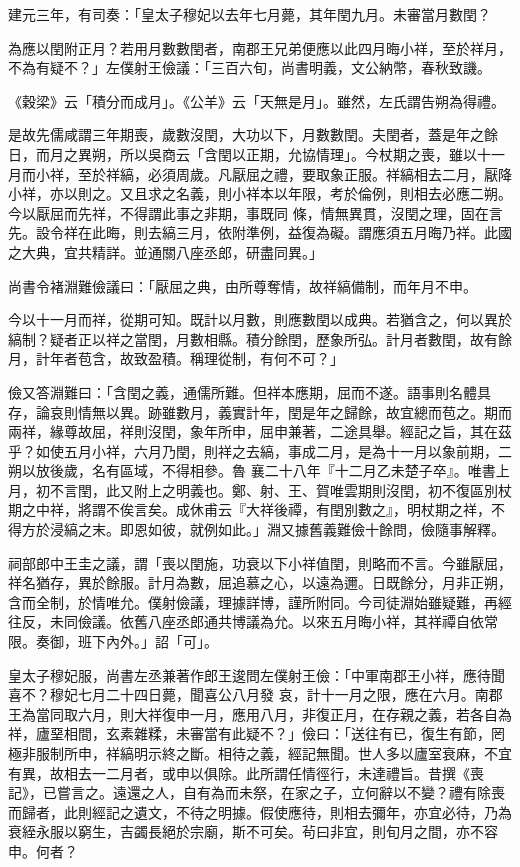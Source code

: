 \begin{pinyinscope}
 建元三年，有司奏：「皇太子穆妃以去年七月薨，其年閏九月。未審當月數閏？



 為應以閏附正月？若用月數數閏者，南郡王兄弟便應以此四月晦小祥，至於祥月，不為有疑不？」左僕射王儉議：「三百六旬，尚書明義，文公納幣，春秋致譏。



 《穀梁》云「積分而成月」。《公羊》云「天無是月」。雖然，左氏謂告朔為得禮。



 是故先儒咸謂三年期喪，歲數沒閏，大功以下，月數數閏。夫閏者，蓋是年之餘日，而月之異朔，所以吳商云「含閏以正期，允協情理」。今杖期之喪，雖以十一月而小祥，至於祥縞，必須周歲。凡厭屈之禮，要取象正服。祥縞相去二月，厭降小祥，亦以則之。又且求之名義，則小祥本以年限，考於倫例，則相去必應二朔。今以厭屈而先祥，不得謂此事之非期，事既同
 條，情無異貫，沒閏之理，固在言先。設令祥在此晦，則去縞三月，依附準例，益復為礙。謂應須五月晦乃祥。此國之大典，宜共精詳。並通關八座丞郎，研盡同異。」



 尚書令褚淵難儉議曰：「厭屈之典，由所尊奪情，故祥縞備制，而年月不申。



 今以十一月而祥，從期可知。既計以月數，則應數閏以成典。若猶含之，何以異於縞制？疑者正以祥之當閏，月數相縣。積分餘閏，歷象所弘。計月者數閏，故有餘月，計年者苞含，故致盈積。稱理從制，有何不可？」



 儉又答淵難曰：「含閏之義，通儒所難。但祥本應期，屈而不遂。語事則名體具存，論哀則情無以異。跡雖數月，義實計年，閏是年之歸餘，故宜總而苞之。期而兩祥，緣尊故屈，祥則沒閏，象年所申，屈申兼著，二途具舉。經記之旨，其在茲乎？如使五月小祥，六月乃閏，則祥之去縞，事成二月，是為十一月以象前期，二朔以放後歲，名有區域，不得相參。魯
 襄二十八年『十二月乙未楚子卒』。唯書上月，初不言閏，此又附上之明義也。鄭、射、王、賀唯雲期則沒閏，初不復區別杖期之中祥，將謂不俟言矣。成休甫云『大祥後禫，有閏別數之』，明杖期之祥，不得方於浸縞之末。即恩如彼，就例如此。」淵又據舊義難儉十餘問，儉隨事解釋。



 祠部郎中王圭之議，謂「喪以閏施，功衰以下小祥值閏，則略而不言。今雖厭屈，祥名猶存，異於餘服。計月為數，屈追慕之心，以遠為邇。日既餘分，月非正朔，含而全制，於情唯允。僕射儉議，理據詳博，謹所附同。今司徒淵始雖疑難，再經往反，未同儉議。依舊八座丞郎通共博議為允。以來五月晦小祥，其祥禫自依常限。奏御，班下內外。」詔「可」。



 皇太子穆妃服，尚書左丞兼著作郎王逡問左僕射王儉：「中軍南郡王小祥，應待聞喜不？穆妃七月二十四日薨，聞喜公八月發
 哀，計十一月之限，應在六月。南郡王為當同取六月，則大祥復申一月，應用八月，非復正月，在存親之義，若各自為祥，廬堊相間，玄素雜糅，未審當有此疑不？」儉曰：「送往有已，復生有節，罔極非服制所申，祥縞明示終之斷。相待之義，經記無聞。世人多以廬室衰麻，不宜有異，故相去一二月者，或申以俱除。此所謂任情徑行，未達禮旨。昔撰《喪記》，已嘗言之。遠還之人，自有為而未祭，在家之子，立何辭以不變？禮有除喪而歸者，此則經記之遺文，不待之明據。假使應待，則相去彌年，亦宜必待，乃為衰絰永服以窮生，吉蠲長絕於宗廟，斯不可矣。茍曰非宜，則旬月之間，亦不容申。何者？




\end{pinyinscope}
